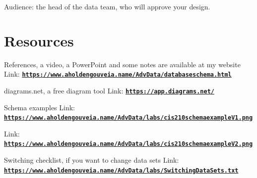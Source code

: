 \documentclass[12pt]{article}
\begin{document}
Audience: the head of the data team, who will approve your design.

\section*{Resources}
References, a video, a PowerPoint and some notes are available at my website
Link: \href{https://www.aholdengouveia.name/AdvData/databaseschema.html}{\textbf{\nolinkurl{https://www.aholdengouveia.name/AdvData/databaseschema.html}}}

diagrams.net, a free diagram tool
Link: \href{https://app.diagrams.net/}{\textbf{\nolinkurl{https://app.diagrams.net/}}}

Schema examples
Link: \href{https://www.aholdengouveia.name/AdvData/labs/cis210schemaexampleV1.png}{\textbf{\nolinkurl{https://www.aholdengouveia.name/AdvData/labs/cis210schemaexampleV1.png}}}

Link: \href{https://www.aholdengouveia.name/AdvData/labs/cis210schemaexampleV2.png}{\textbf{\nolinkurl{https://www.aholdengouveia.name/AdvData/labs/cis210schemaexampleV2.png}}}

Switching checklist, if you want to change data sets
Link: \href{https://www.aholdengouveia.name/AdvData/labs/SwitchingDataSets.txt}{\textbf{\nolinkurl{https://www.aholdengouveia.name/AdvData/labs/SwitchingDataSets.txt}}}
\end{document}
